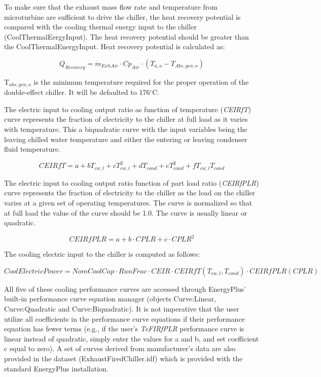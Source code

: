 To make sure that the exhaust mass flow rate and temperature from microturbine are sufficient to drive the chiller, the heat recovery potential is compared with the cooling thermal energy input to the chiller (CoolThermalEergyInput). The heat recovery potential should be greater than the CoolThermalEnergyInput. Heat recovery potential is calculated as:

\begin{equation}
{Q_{Recovery}} = {\dot m_{ExhAir}} \cdot C{p_{Air}} \cdot ({T_{a,o}} - {T_{Abs,gen,o}})
\end{equation}

T\(_{abs,gen,o}\) is the minimum temperature required for the proper operation of the double-effect chiller. It will be defaulted to 176\(^{\circ}\)C.

The electric input to cooling output ratio as function of temperature (\emph{CEIRfT}) curve represents the fraction of electricity to the chiller at full load as it varies with temperature. This a biquadratic curve with the input variables being the leaving chilled water temperature and either the entering or leaving condenser fluid temperature.

\begin{equation}
CEIRfT = a + b{T_{cw,l}} + cT_{cw,l}^2 + d{T_{cond}} + eT_{cond}^2 + f{T_{cw,l}}{T_{cond}}
\end{equation}

The electric input to cooling output ratio function of part load ratio (\emph{CEIRfPLR}) curve represents the fraction of electricity to the chiller as the load on the chiller varies at a given set of operating temperatures. The curve is normalized so that at full load the value of the curve should be 1.0. The curve is usually linear or quadratic.

\begin{equation}
CEIRfPLR = a + b \cdot CPLR + c \cdot CPL{R^2}
\end{equation}

The cooling electric input to the chiller is computed as follows:

\begin{equation}
CoolElectricPower = NomCoolCap \cdot RunFrac \cdot CEIR \cdot CEIRfT\left( {{T_{cw,l}},{T_{cond}}} \right) \cdot CEIRfPLR(CPLR)
\end{equation}

All five of these cooling performance curves are accessed through EnergyPlus' built-in performance curve equation manager (objects Curve:Linear, Curve:Quadratic and Curve:Biquadratic). It is not imperative that the user utilize all coefficients in the performance curve equations if their performance equation has fewer terms (e.g., if the user's \emph{TeFIRfPLR} performance curve is linear instead of quadratic, simply enter the values for a and b, and set coefficient c equal to zero). A set of curves derived from manufacturer's data are also provided in the dataset (ExhaustFiredChiller.idf) which is provided with the standard EnergyPlus installation.

